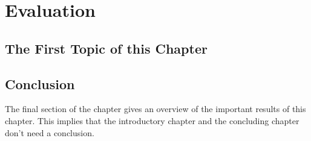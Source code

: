 \chapter{Evaluation}
\label{cha:5}


\section{The First Topic of this Chapter}

%
%
%
%
%

\section{Conclusion}
The final section of the chapter gives an overview of the important results
of this chapter. This implies that the introductory chapter and the
concluding chapter don't need a conclusion.

